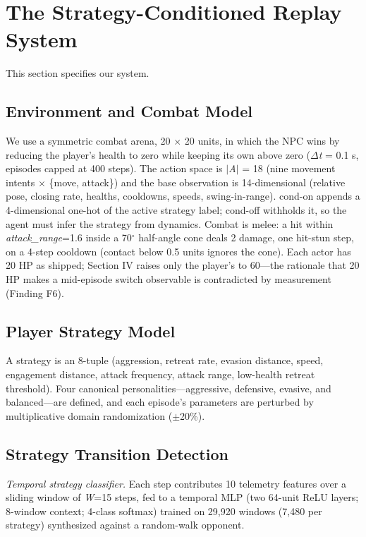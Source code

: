 \documentclass[conference,9pt]{IEEEtran}
\begin{document}
\section{The Strategy-Conditioned Replay System}

This section specifies our system.

\subsection{Environment and Combat Model}

We use a symmetric combat arena, 20 $\times$ 20 units, in which the NPC wins by reducing the player's health to zero while keeping its own above zero ($\Delta$\textit{t} = 0.1 s, episodes capped at 400 steps). The action space is $|$\textit{A}$|$ = 18 (nine movement intents $\times$ \{move, attack\}) and the base observation is 14-dimensional (relative pose, closing rate, healths, cooldowns, speeds, swing-in-range). cond-on appends a 4-dimensional one-hot of the active strategy label; cond-off withholds it, so the agent must infer the strategy from dynamics. Combat is melee: a hit within \textit{attack\_range}=1.6 inside a 70$^\circ$ half-angle cone deals 2 damage, one hit-stun step, on a 4-step cooldown (contact below 0.5 units ignores the cone). Each actor has 20 HP as shipped; Section IV raises only the player's to 60---the rationale that 20 HP makes a mid-episode switch observable is contradicted by measurement (Finding F6).

\subsection{Player Strategy Model}

A strategy is an 8-tuple (aggression, retreat rate, evasion distance, speed, engagement distance, attack frequency, attack range, low-health retreat threshold). Four canonical personalities---aggressive, defensive, evasive, and balanced---are defined, and each episode's parameters are perturbed by multiplicative domain randomization ($\pm$20\%).

\subsection{Strategy Transition Detection}

\textit{Temporal strategy classifier.} Each step contributes 10 telemetry features over a sliding window of \textit{W}=15 steps, fed to a temporal MLP (two 64-unit ReLU layers; 8-window context; 4-class softmax) trained on 29,920 windows (7,480 per strategy) synthesized against a random-walk opponent.
\end{document}
